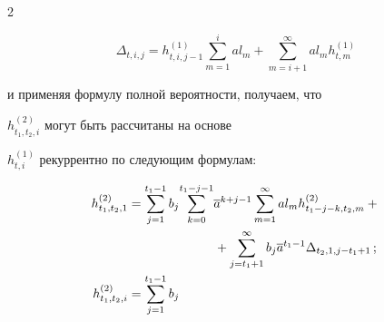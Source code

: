 \begin{multicols}{2}
\vspace*{2pt}





\noindent


$$


\Delta_{t,i,j}=


h^{(1)}_{t,i,j-1} \sum\limits_{m=1}^{i} a l_m 


+\sum\limits_{m=i+1}^{\infty} a l_m


h^{(1)}_{t,m}


$$





\noindent  


и применяя формулу полной вероятности, получаем, что


$h^{(2)}_{t_1,t_2,i}$ могут быть рассчитаны на основе


$h^{(1)}_{t,i}$ рекуррентно по следующим формулам:





\vspace*{-3pt}





\noindent


\begin{align*}




h^{(2)}_{t_1,t_2,1} &=


\sum\limits_{j=1}^{t_1-1}b_j


\!\sum\limits_{k=0}^{t_1-j-1}\!


\overline{a}^{k+j-1}


\sum\limits_{m=1}^{\infty} a l_m


h^{(2)}_{t_1-j-k,t_2,m}+{}\\


&\hspace*{24mm}{}+\sum\limits_{j=t_1+1}^{\infty}


b_j \overline{a}^{t_1-1}


\Delta_{t_2,1,j-t_1+1}\,;\\








h^{(2)}_{t_1,t_2,i} &=


\sum\limits_{j=1}^{t_1-1} b_j



\end{align*}
\end{multicols}
